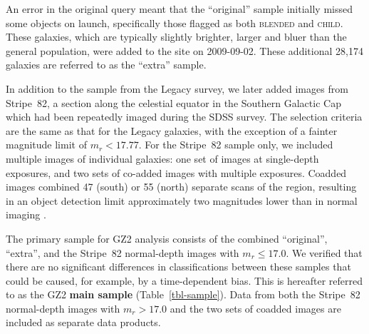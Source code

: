 \documentclass[useAMS,usenatbib]{mn2e}
\begin{document}
An error in the original query meant that the ``original'' sample initially missed some objects on launch, specifically those flagged as both \textsc{blended} and \textsc{child}. These galaxies, which are typically slightly brighter, larger and bluer than the general population, were added to the site on 2009-09-02. These additional 28,174 galaxies are referred to as the ``extra'' sample. 

In addition to the sample from the Legacy survey, we later added images from Stripe~82, a section along the celestial equator in the Southern Galactic Cap which had been repeatedly imaged during the SDSS survey. The selection criteria are the same as that for the Legacy galaxies, with the exception of a fainter magnitude limit of $m_r < 17.77$. For the Stripe~82 sample only, we included multiple images of individual galaxies: one set of images at single-depth exposures, and two sets of co-added images with multiple exposures. Coadded images combined 47 (south) or 55 (north) separate scans of the region, resulting in an object detection limit approximately two magnitudes lower than in normal imaging \citep{ann11}. 

The primary sample for GZ2 analysis consists of the combined ``original'', ``extra'', and the Stripe~82 normal-depth images with $m_r\leq17.0$. We verified that there are no significant differences in classifications between these samples that could be caused, for example, by a time-dependent bias. This is hereafter referred to as the GZ2 {\bf main sample} (Table~\ref{tbl-sample}). Data from both the Stripe~82 normal-depth images with $m_r>17.0$ and the two sets of coadded images are included as separate data products. 
\end{document}
